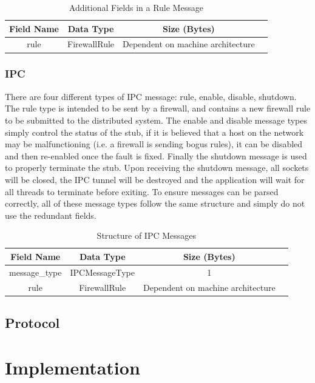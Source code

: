 \documentclass[a4paper, 11pt]{report}
\begin{document}
\begin{table}[H]
\centering
\begin{tabular}{ |c|c|c|c| } 
\hline
Field Name & Data Type & Size (Bytes) \\
\hline
rule & FirewallRule & Dependent on machine architecture \\ 
\hline
\end{tabular}
\caption{Additional Fields in a Rule Message}
\label{tab:rule}
\end{table}

\subsection{IPC}
There are four different types of \acrshort{IPC} message: rule, enable, disable, shutdown. The rule type is intended to be sent by a firewall, and contains a new firewall rule to be submitted to the distributed system. The enable and disable message types simply control the status of the stub, if it is believed that a host on the network may be malfunctioning (i.e. a firewall is sending bogus rules), it can be disabled and then re-enabled once the fault is fixed. Finally the shutdown message is used to properly terminate the \gls{stub}. Upon receiving the shutdown message, all sockets will be closed, the \acrshort{IPC} tunnel will be destroyed and the application will wait for all threads to terminate before exiting.
To ensure messages can be parsed correctly, all of these message types follow the same structure and simply do not use the redundant fields.

\begin{table}[H]
\centering
\begin{tabular}{ |c|c|c|c| } 
\hline
Field Name & Data Type & Size (Bytes) \\
\hline
message_type & IPCMessageType & 1 \\
rule & FirewallRule & Dependent on machine architecture \\
\hline
\end{tabular}
\caption{Structure of \acrshort{IPC} Messages}
\label{tab:ipc}
\end{table}
 
\section{Protocol}

\chapter{Implementation}
\end{document}
